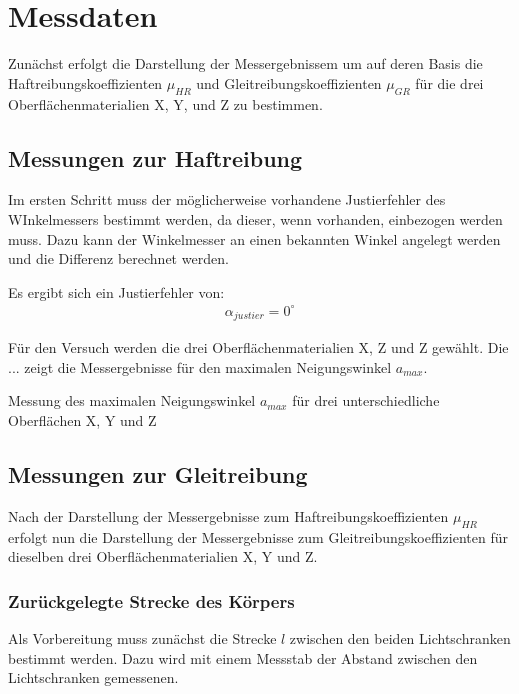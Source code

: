 \section{Messdaten}

Zunächst erfolgt die Darstellung der Messergebnissem um auf deren Basis die Haftreibungskoeffizienten $\mu_{HR}$ und Gleitreibungskoeffizienten $\mu_{GR}$ für die drei Oberflächenmaterialien X, Y, und Z zu bestimmen.

\subsection{Messungen zur Haftreibung}

Im ersten Schritt muss der möglicherweise vorhandene Justierfehler des WInkelmessers bestimmt werden, da dieser, wenn vorhanden, einbezogen werden muss. Dazu kann der Winkelmesser an einen bekannten Winkel angelegt werden und die Differenz berechnet werden. 

Es ergibt sich ein Justierfehler von:
\begin{align*}
    \alpha_{justier} = 0^\circ
\end{align*}

Für den Versuch werden die drei Oberflächenmaterialien X, Z und Z gewählt. Die ... zeigt die Messergebnisse für den maximalen Neigungswinkel $a_{max}$.

\begin{table}[h]
    \center
    \caption[Messung des maximalen Neigungswinkel]{Messung des maximalen Neigungswinkel $a_{max}$ für drei unterschiedliche Oberflächen X, Y und Z}
    
    \label{tab:maximalerNeigungswinkel}
\end{table}

\subsection{Messungen zur Gleitreibung}

Nach der Darstellung der Messergebnisse zum Haftreibungskoeffizienten $\mu_{HR}$ erfolgt nun die Darstellung der Messergebnisse zum Gleitreibungskoeffizienten für dieselben drei Oberflächenmaterialien X, Y und Z.

\subsubsection{Zurückgelegte Strecke des Körpers}

Als Vorbereitung muss zunächst die Strecke $l$ zwischen den beiden Lichtschranken bestimmt werden.
Dazu wird mit einem Messstab der Abstand zwischen den Lichtschranken gemessenen.

